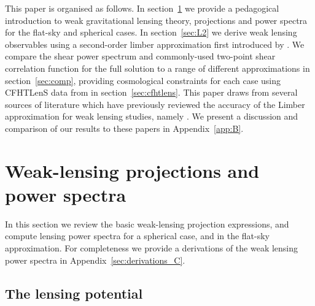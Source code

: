 \documentclass[fleqn,usenatbib]{mnras} %
\begin{document}
This paper is organised as follows.  In section~\ref{sec:wl} we provide a pedagogical introduction to weak gravitational lensing theory, projections and power spectra for the flat-sky and spherical cases.  In section~\ref{sec:L2} we derive weak lensing observables using a second-order limber approximation first introduced by \citet{2008PhRvD..78l3506L}.  We compare the shear power spectrum and commonly-used two-point shear correlation function for the full solution to a range of different approximations in section~\ref{sec:comp}, providing cosmological constraints for each case using CFHTLenS data from \citet{CFHTLenS-2pt-notomo} in section~\ref{sec:cfhtlens}.  This paper draws from several sources of literature which have previously reviewed the accuracy of the Limber approximation for weak lensing studies, namely \citet{2008PhRvD..78d3002S,2012PhRvD..86b3001B, 2012MNRAS.422.2854G, 2016arXiv161104954K}.   We present a discussion and comparison of our results to these papers in Appendix~\ref{app:B}.


\section{Weak-lensing projections and power spectra}
\label{sec:wl}

In this section we review the basic weak-lensing projection expressions, and
compute lensing power spectra for a spherical case, and in the flat-sky
approximation. For completeness we provide a derivations of the weak lensing power spectra in Appendix~\ref{sec:derivations_C}.

\subsection{The lensing potential}
\label{sec:psi}
\end{document}
